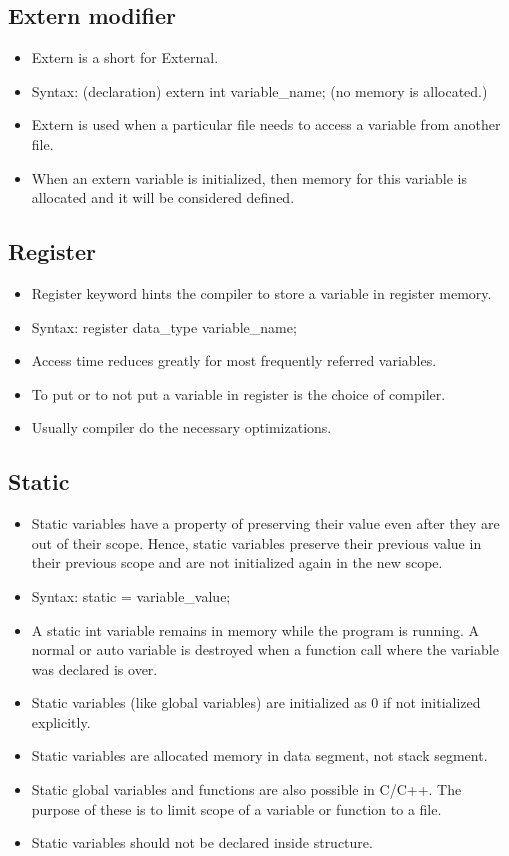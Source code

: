 \subsection{Extern modifier}
\begin{itemize}
    \item Extern is a short for External.
    \item Syntax: (declaration) extern int variable\_name; (no memory is allocated.)
    \item Extern is used when a particular file needs to access a variable from another file.
    \item When an extern variable is initialized, then memory for this variable is allocated and it will be considered defined.
\end{itemize}

\subsection{Register}
\begin{itemize}
    \item Register keyword hints the compiler to store a variable in register memory.
    \item Syntax: register data\_type variable\_name;
    \item Access time reduces greatly for most frequently referred variables.
    \item To put or to not put a variable in register is the choice of compiler.
    \item Usually compiler do the necessary optimizations.
\end{itemize}

\subsection{Static}
\begin{itemize}
    \item Static variables have a property of preserving their value even after they are out of their scope. Hence, static variables preserve their previous value in their previous scope and are not initialized again in the new scope. 
    \item Syntax: static   = variable\_value; 
    \item  A static int variable remains in memory while the program is running. A normal or auto variable is destroyed when a function call where the variable was declared is over. 
    \item Static variables (like global variables) are initialized as 0 if not initialized explicitly.
    \item Static variables are allocated memory in data segment, not stack segment.
    \item Static global variables and functions are also possible in C/C++. The purpose of these is to limit scope of a variable or function to a file.
    \item Static variables should not be declared inside structure. 
\end{itemize}